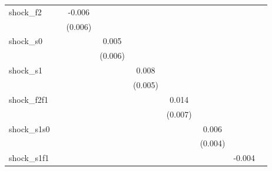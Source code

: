 {\begin{tabular}{l*{8}{c}}
\addlinespace
shock\_f2    &                     &      -0.006         &                     &                     &                     &                     &                     &                     \\
            &                     &     (0.006)         &                     &                     &                     &                     &                     &                     \\
\addlinespace
shock\_s0    &                     &                     &       0.005         &                     &                     &                     &                     &                     \\
            &                     &                     &     (0.006)         &                     &                     &                     &                     &                     \\
\addlinespace
shock\_s1    &                     &                     &                     &       0.008         &                     &                     &                     &                     \\
            &                     &                     &                     &     (0.005)         &                     &                     &                     &                     \\
\addlinespace
shock\_f2f1  &                     &                     &                     &                     &       0.014\sym{*}  &                     &                     &                     \\
            &                     &                     &                     &                     &     (0.007)         &                     &                     &                     \\
\addlinespace
shock\_s1s0  &                     &                     &                     &                     &                     &       0.006         &                     &                     \\
            &                     &                     &                     &                     &                     &     (0.004)         &                     &                     \\
\addlinespace
shock\_s1f1  &                     &                     &                     &                     &                     &                     &      -0.004         &                     \\

\end{tabular}}
